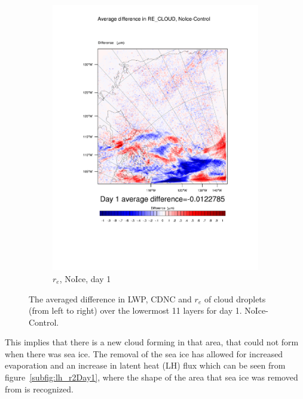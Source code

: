 \begin{figure}
	\begin{subfigure}{0.40\textwidth}
		\centering
		\includegraphics[width=\textwidth]{results/noice/diff_NoIce_RE_CLOUD_Day1.pdf}
		\caption{$r_e$, NoIce, day 1}
		\label{subfig:recloud_r2Day1}
	\end{subfigure}
\caption{The averaged difference in LWP, CDNC and $r_e$ of cloud droplets (from left to right) over the lowermost 11 layers for day 1. NoIce-Control.}
\label{fig:lwpcdncre_r2Day1}
\end{figure}

This implies that there is a new cloud forming in that area, that could not form when there was sea ice. The removal of the sea ice has allowed for increased evaporation and an increase in latent heat (LH) flux which can be seen from figure~\ref{subfig:lh_r2Day1}, where the shape of the area that sea ice was removed from is recognized.

